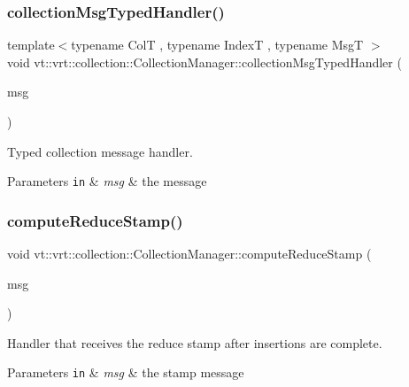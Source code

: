 \subsubsection{\texorpdfstring{collection\+Msg\+Typed\+Handler()}{collectionMsgTypedHandler()}}
{\footnotesize\ttfamily template$<$typename ColT , typename IndexT , typename MsgT $>$ \\
void vt\+::vrt\+::collection\+::\+Collection\+Manager\+::collection\+Msg\+Typed\+Handler (\begin{DoxyParamCaption}\item[{MsgT $\ast$}]{msg }\end{DoxyParamCaption})\hspace{0.3cm}{\ttfamily [static]}}



Typed collection message handler. 


\begin{DoxyParams}[1]{Parameters}
\mbox{\tt in}  & {\em msg} & the message \\
\hline
\end{DoxyParams}
\mbox{\label{structvt_1_1vrt_1_1collection_1_1_collection_manager_aee32428b23705756658c5e27f336725e}} 
\subsubsection{\texorpdfstring{compute\+Reduce\+Stamp()}{computeReduceStamp()}}
{\footnotesize\ttfamily void vt\+::vrt\+::collection\+::\+Collection\+Manager\+::compute\+Reduce\+Stamp (\begin{DoxyParamCaption}\item[{\hyperlink{structvt_1_1vrt_1_1collection_1_1_collection_stamp_msg}{Collection\+Stamp\+Msg} $\ast$}]{msg }\end{DoxyParamCaption})\hspace{0.3cm}{\ttfamily [static]}}



Handler that receives the reduce stamp after insertions are complete. 


\begin{DoxyParams}[1]{Parameters}
\mbox{\tt in}  & {\em msg} & the stamp message \\
\hline
\end{DoxyParams}
\mbox{\label{structvt_1_1vrt_1_1collection_1_1_collection_manager_a779338baed0f13c1e96b498560db9cbc}} 
